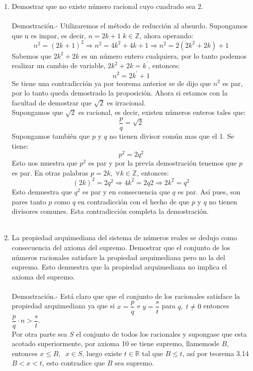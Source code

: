 \begin{enumerate}[\bfseries  1.]
\item Demostrar que no existe número racional cuyo cuadrado sea 2.\\\\
Demostración.- \; Utilizaremos el método de reducción al absurdo. Supongamos que n es impar, es decir, $n=2k+1\; k \in \mathbb{Z}$, ahora operando:
$$n^2=(2k+1)^2 \Rightarrow  n^2 = 4k^2 +4k + 1 \Rightarrow n^2=2(2k^2+2k)+1$$
Sabemos que $2k^2+2k$ es un número entero cualquiera, por lo tanto podemos realizar un cambio de variable, $2k^2+2k = k^{'}$, entonces:
$$n^2=2k^{'} +1$$
Se tiene una contradicción ya por teorema anterior se de dijo que $n^2$ es par, por lo tanto queda demostrado la proposición.  
Ahora si estamos con la facultad de demostrar que  $\sqrt{2}$ es irracional.\\
Supongamos que $\sqrt{2}$ es racional, es decir, existen números enteros tales que:
$$\displaystyle\frac{p}{q}=\sqrt{2}$$
Supongamos también que $p$ y $q$ no tienen divisor común mas que el 1. Se tiene:
$$p^2=2q^2$$
Esto nos muestra que $p^2$ es par y  por la previa demostración tenemos que $p$ es par. En otras palabras $p = 2k, \; \forall k \in \mathbb{Z}$, entonces:
$$(2k)^2 = 2q^2 \Rightarrow 4k^2 = 2q2 \Rightarrow 2k^2 = q^2 $$
Esto demuestra que $q^2$ es par y en consecuencia que $q$ es par. Así pues, son pares tanto $p$ como $q$ en contradicción con el hecho de que $p$ y $q$ no tienen divisores comunes. Esta contradicción completa la demostración.\\\\

\item La propiedad arquimediana del sistema de números reales se dedujo como consecuencia del axioma del supremo. Demostrar que el conjunto de los números racionales satisface la propiedad arquimediana pero no la del supremo. Esto demuestra que la propiedad arquimediana no implica el axioma del supremo.\\\\
Demostración.- \; Está claro que que el conjunto de los racionales satisface la propiedad arquimediana ya que si $x=\dfrac{p}{q}$ e $y=\dfrac{s}{t}$ para $q,\; t \neq 0$ entonces $\dfrac{p}{q}\cdot n>\dfrac{s}{t}$.\\
Por otra parte sea $S$ el conjunto de todos los racionales y supongase que esta acotado superiormente, por axioma 10 se tiene supremo, llamemosle $B$, entonces $x\leq B, \; \; x \in S$, luego existe $t\in \mathbb{R}$ tal que $B\leq t$, así por teorema 3.14 \; $B<x<t$,  esto contradice que $B$ sea supremo.\\\\ 


\end{enumerate}
